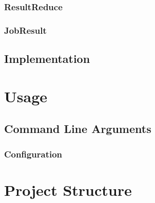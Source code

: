 \documentclass[12pt, letterpaper]{article}
\begin{document}
\subsubsection{ResultReduce}

\subsubsection{JobResult}

\subsection{Implementation}

\section{Usage}
\label{usage}

\subsection{Command Line Arguments}

\subsubsection{Configuration}


\newpage

\section{Project Structure}


\newpage

\printbibliography
\end{document}
